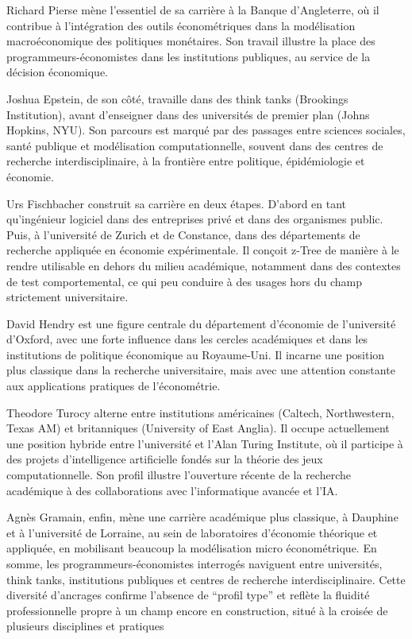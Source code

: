 Richard Pierse mène l’essentiel de sa carrière à la Banque d’Angleterre, où il contribue à l’intégration des outils économétriques dans la modélisation macroéconomique des politiques monétaires. Son travail illustre la place des programmeurs-économistes dans les institutions publiques, au service de la décision économique. 

Joshua Epstein, de son côté, travaille dans des think tanks (Brookings Institution), avant d’enseigner dans des universités de premier plan (Johns Hopkins, NYU). Son parcours est marqué par des passages entre sciences sociales, santé publique et modélisation computationnelle, souvent dans des centres de recherche interdisciplinaire, à la frontière entre politique, épidémiologie et économie. 

Urs Fischbacher construit sa carrière en deux étapes. D’abord en tant qu’ingénieur logiciel dans des entreprises privé et dans des organismes public. Puis, à l’université de Zurich et de Constance, dans des départements de recherche appliquée en économie expérimentale. Il conçoit z-Tree de manière à le rendre utilisable en dehors du milieu académique, notamment dans des contextes de test comportemental, ce qui peu conduire à des usages hors du champ strictement universitaire. 

David Hendry est une figure centrale du département d’économie de l’université d’Oxford, avec une forte influence dans les cercles académiques et dans les institutions de politique économique au Royaume-Uni. Il incarne une position plus classique dans la recherche universitaire, mais avec une attention constante aux applications pratiques de l’économétrie. 

Theodore Turocy alterne entre institutions américaines (Caltech, Northwestern, Texas AM) et britanniques (University of East Anglia). Il occupe actuellement une position hybride entre l’université et l’Alan Turing Institute, où il participe à des projets d’intelligence artificielle fondés sur la théorie des jeux computationnelle. Son profil illustre l’ouverture récente de la recherche académique à des collaborations avec l’informatique avancée et l’IA. 

Agnès Gramain, enfin, mène une carrière académique plus classique, à Dauphine et à l’université de Lorraine, au sein de laboratoires d’économie théorique et appliquée, en mobilisant beaucoup la modélisation micro économétrique. En somme, les programmeurs-économistes interrogés naviguent entre universités, think tanks, institutions publiques et centres de recherche interdisciplinaire. Cette diversité d’ancrages confirme l’absence de “profil type” et reflète la fluidité professionnelle propre à un champ encore en construction, situé à la croisée de plusieurs disciplines et pratiques




